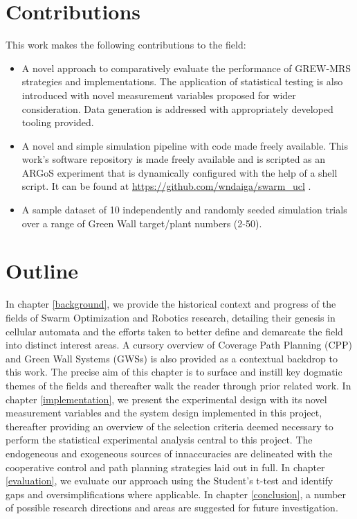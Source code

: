 \documentclass{report}
\begin{document}
\section{Contributions}
This work makes the following contributions to the field:

\begin{itemize}
	\item A novel approach to comparatively evaluate the performance of GREW-MRS strategies and implementations. The application of statistical testing is also introduced with novel measurement variables proposed for wider consideration. Data generation is addressed with appropriately developed tooling provided.
	\item A novel and simple simulation pipeline with code made freely available. This work's software repository is made freely available and is scripted as an ARGoS experiment that is dynamically configured with the help of a shell script. It can be found at \url{https://github.com/wndaiga/swarm_ucl} \cite{SWARMCODE}.
	\item A sample dataset of 10 independently and randomly seeded simulation trials over a range of Green Wall target/plant numbers (2-50).
\end{itemize}

\section{Outline}

In chapter \ref{background}, we provide the historical context and progress of the fields of Swarm Optimization and Robotics research, detailing their genesis in cellular automata and the efforts taken to better define and demarcate the field into distinct interest areas. A cursory overview of Coverage Path Planning (CPP) and Green Wall Systems (GWSs) is also provided as a contextual backdrop to this work. The precise aim of this chapter is to surface and instill key dogmatic themes of the fields and thereafter walk the reader through prior related work.  In chapter \ref{implementation}, we present the experimental design with its novel measurement variables and the system design implemented in this project, thereafter providing an overview of the selection criteria deemed necessary to perform the statistical experimental analysis central to this project. The endogeneous and exogeneous sources of innaccuracies are delineated with the cooperative control and path planning strategies laid out in full. In chapter \ref{evaluation}, we evaluate our approach using the Student's t-test \cite{Kennedy1995} and identify gaps and oversimplifications where applicable. In chapter \ref{conclusion}, a number of possible research directions and areas are suggested for future investigation.
\end{document}
